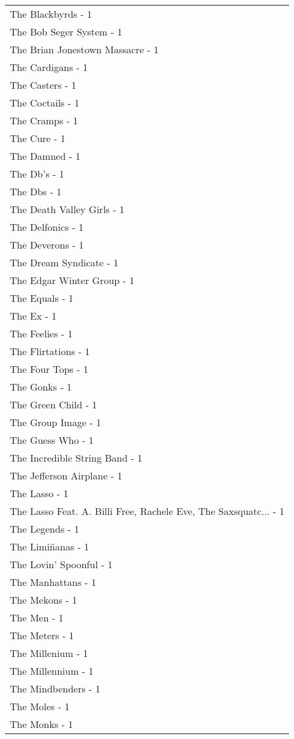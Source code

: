 \documentclass[
]{article}
\begin{document}
\begin{longtable}{l}
The Blackbyrds - 1 \\ 
The Bob Seger System - 1 \\ 
The Brian Jonestown Massacre - 1 \\ 
The Cardigans - 1 \\ 
The Casters - 1 \\ 
The Coctails - 1 \\ 
The Cramps - 1 \\ 
The Cure - 1 \\ 
The Damned - 1 \\ 
The Db's - 1 \\ 
The Dbs - 1 \\ 
The Death Valley Girls - 1 \\ 
The Delfonics - 1 \\ 
The Deverons - 1 \\ 
The Dream Syndicate - 1 \\ 
The Edgar Winter Group - 1 \\ 
The Equals - 1 \\ 
The Ex - 1 \\ 
The Feelies - 1 \\ 
The Flirtations - 1 \\ 
The Four Tops - 1 \\ 
The Gonks - 1 \\ 
The Green Child - 1 \\ 
The Group Image - 1 \\ 
The Guess Who - 1 \\ 
The Incredible String Band - 1 \\ 
The Jefferson Airplane - 1 \\ 
The Lasso - 1 \\ 
The Lasso Feat. A. Billi Free, Rachele Eve, The Saxsquatc... - 1 \\ 
The Legends - 1 \\ 
The Limiñanas - 1 \\ 
The Lovin' Spoonful - 1 \\ 
The Manhattans - 1 \\ 
The Mekons - 1 \\ 
The Men - 1 \\ 
The Meters - 1 \\ 
The Millenium - 1 \\ 
The Millennium - 1 \\ 
The Mindbenders - 1 \\ 
The Moles - 1 \\ 
The Monks - 1 \\ 

\end{longtable}
\end{document}
